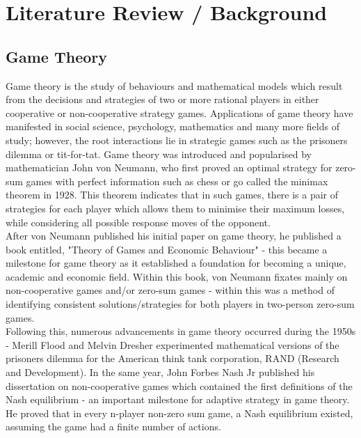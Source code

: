\documentclass[11pt, a4paper]{article}
\title{\vspace{-7cm}}
\author{}
\date{}
\begin{document}
\maketitle

\section{Literature Review / Background}

\subsection{Game Theory}
Game theory is the study of behaviours and mathematical models which result from the decisions and strategies of two or more rational players in either cooperative or non-cooperative strategy games. Applications of game theory have manifested in social science, psychology, mathematics and many more fields of study; however, the root interactions lie in strategic games such as the prisoners dilemma or tit-for-tat. Game theory was introduced and popularised by mathematician John von Neumann, who first proved an optimal strategy for zero-sum games with perfect information such as chess or go called the minimax theorem in 1928. This theorem indicates that in such games, there is a pair of strategies for each player which allows them to minimise their maximum losses, while considering all possible response moves of the opponent. \\
\noindent
After von Neumann published his initial paper on game theory, he published a book entitled, "Theory of Games and Economic Behaviour" - this became a milestone for game theory as it established a foundation for becoming a unique, academic and economic field. Within this book, von Neumann fixates mainly on non-cooperative games and/or zero-sum games - within this was a method of identifying consistent solutions/strategies for both players in two-person zero-sum games. \\
\noindent
Following this, numerous advancements in game theory occurred during the 1950s - Merill Flood and Melvin Dresher experimented mathematical versions of the prisoners dilemma for the American think tank corporation, RAND (Research and Development). In the same year, John Forbes Nash Jr published his dissertation on non-cooperative games which contained the first definitions of the Nash equilibrium - an important milestone for adaptive strategy in game theory. He proved that in every n-player non-zero sum game, a Nash equilibrium existed, assuming the game had a finite number of actions. 

\noindent

\clearpage
\end{document}
